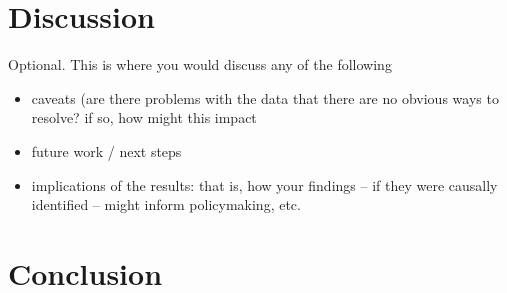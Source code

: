 \documentclass[12pt]{article}
\begin{document}


\section{Discussion}
\label{sec:discussion}

Optional. This is where you would discuss any of the following
\begin{itemize}
    \item caveats (are there problems with the data that there are no obvious ways to resolve? if so, how might this impact
    \item future work / next steps
    \item     implications of the results: that is, how your findings -- if they were causally identified -- might inform policymaking, etc.
    \end{itemize}
\section{Conclusion}
\label{sec:conclusion}
\end{document}
